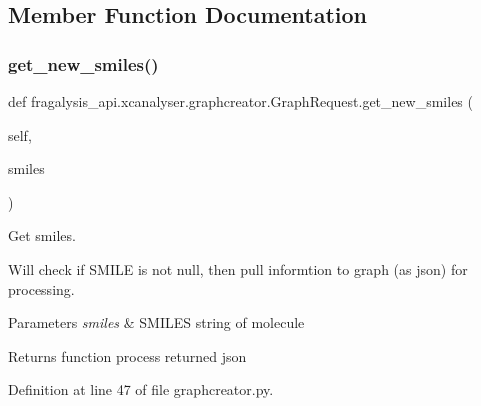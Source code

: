 \subsection{Member Function Documentation}
\mbox{\label{classfragalysis__api_1_1xcanalyser_1_1graphcreator_1_1_graph_request_a1ca3ed55492a1722ef0feb76c7fba43f}} 
\subsubsection{\texorpdfstring{get\+\_\+new\+\_\+smiles()}{get\_new\_smiles()}}
{\footnotesize\ttfamily def fragalysis\+\_\+api.\+xcanalyser.\+graphcreator.\+Graph\+Request.\+get\+\_\+new\+\_\+smiles (\begin{DoxyParamCaption}\item[{}]{self,  }\item[{}]{smiles }\end{DoxyParamCaption})}



Get smiles. 

Will check if S\+M\+I\+LE is not null, then pull informtion to graph (as json) for processing. 
\begin{DoxyParams}{Parameters}
{\em smiles} & S\+M\+I\+L\+ES string of molecule \\
\hline
\end{DoxyParams}
\begin{DoxyReturn}{Returns}
function process returned json 
\end{DoxyReturn}


Definition at line 47 of file graphcreator.\+py.


